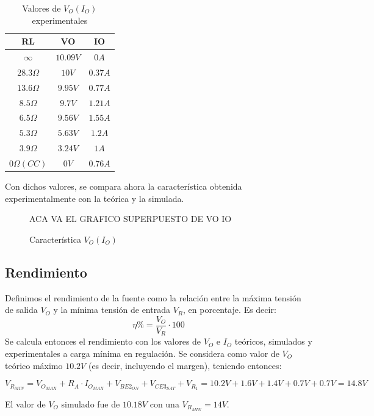 \begin{table}[!ht]
\begin{centering}

\begin{tabular}[H]{|c|c|c|}
\hline 
RL & VO & IO\tabularnewline
\hline 
\hline 
$\infty$ & $10.09V$ & $0A$\tabularnewline
\hline 
$28.3 \Omega$ & $10V$ & $0.37A$\tabularnewline
\hline 
$13.6 \Omega$ & $9.95V$ & $0.77A$\tabularnewline
\hline 
$8.5 \Omega$ & $9.7V$ & $1.21A$\tabularnewline
\hline 
$6.5 \Omega$ & $9.56V$ & $1.55A$\tabularnewline
\hline 
$5.3 \Omega$ & $5.63V$ & $1.2A$\tabularnewline
\hline 
$3.9 \Omega$ & $3.24V$ & $1A$\tabularnewline
\hline 
$0 \Omega (CC)$ & $0V$ & $0.76A$\tabularnewline
\hline 
\end{tabular}
\par\end{centering}
\caption{Valores de $V_O(I_O)$ experimentales}

\end{table}

Con dichos valores, se compara ahora la caracter\'istica obtenida experimentalmente con la te\'orica y la simulada.

\begin{figure}[!ht]
\begin{centering}
ACA VA EL GRAFICO SUPERPUESTO DE VO IO
\par\end{centering}
\caption{Caracter\'istica $V_O(I_O)$}

\end{figure}  

\subsection{Rendimiento}

Definimos el rendimiento de la fuente como la relaci\'on entre la m\'axima tensi\'on de salida $V_O$ y la m\'inima tensi\'on de entrada $V_R$, en porcentaje. Es decir:
\[
\eta \% = \frac{V_O}{V_R} \cdot 100
\]
Se calcula entonces el rendimiento con los valores de $V_O$ e $I_O$ te\'oricos, simulados y experimentales a carga m\'inima en regulaci\'on.
Se considera como valor de $V_O$ te\'orico m\'aximo $10.2V$ (es decir, incluyendo el margen), teniendo entonces:

\[
V_{R_{MIN}} = V_{O_{MAX}} + R_A \cdot I_{O_{MAX}} + V_{BE2_{ON}} + V_{CE3_{SAT}} + V_{R_1} = 10.2V + 1.6V + 1.4V + 0.7V + 0.7V = 14.8V 
\]

El valor de $V_O$ simulado fue de $10.18V$ con una $V_{R_{MIN}}= 14V$.

